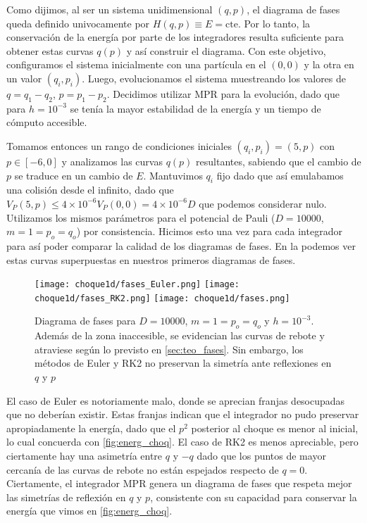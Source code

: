 Como dijimos, al ser un sistema unidimensional $(q,p)$, el diagrama de fases queda definido univocamente por $H(q,p)\equiv E = \text{cte}$.
Por lo tanto, la conservación de la energía por parte de los integradores resulta suficiente para obtener estas curvas $q(p)$ y así construir el diagrama.
Con este objetivo, configuramos el sistema inicialmente con una partícula en el $(0,0)$ y la otra en un valor $(q_i, p_i)$.
Luego, evolucionamos el sistema muestreando los valores de $q = q_1 - q_2$, $p = p_1 - p_2$.
Decidimos utilizar MPR para la evolución, dado que para $h=10^{-3}$ se tenía la mayor estabilidad de la energía y un tiempo de cómputo accesible.

Tomamos entonces un rango de condiciones iniciales $(q_i,p_i)=(5,p)$ con $p\in [-6,0]$ y analizamos las curvas $q(p)$ resultantes, sabiendo que el cambio de $p$ se traduce en un cambio de $E$. 
Mantuvimos $q_i$ fijo dado que así emulabamos una colisión desde el infinito, dado que $V_P(5,p)\leq 4\times10^{-6}V_P(0,0) = 4\times10^{-6}D$ que podemos considerar nulo.
Utilizamos los mismos parámetros para el potencial de Pauli ($D=10000$, $m=1=p_o=q_o$) por consistencia.
Hicimos esto una vez para cada integrador para así poder comparar la calidad de los diagramas de fases.
En la  podemos ver estas curvas superpuestas en nuestros primeros diagramas de fases.

\begin{figure}[H]
	\centering	%
	\texttt{[image: choque1d/fases\_Euler.png]}
	\texttt{[image: choque1d/fases\_RK2.png]}
	\texttt{[image: choque1d/fases.png]}
	\caption{Diagrama de fases para $D=10000$, $m=1=p_o=q_o$ y $h=10^{-3}$. Además de la zona inaccesible, se evidencian las curvas de rebote y atraviese según lo previsto en \ref{sec:teo_fases}.
	Sin embargo, los métodos de Euler y RK2 no preservan la simetría ante reflexiones en $q$ y $p$}
	\label{fig:ej_diag_fases}
\end{figure}

El caso de Euler es notoriamente malo, donde se aprecian franjas desocupadas que no deberían existir. 
Estas franjas indican que el integrador no pudo preservar apropiadamente la energía, dado que el $p^2$ posterior al choque es menor al inicial, lo cual concuerda con \ref{fig:energ_choq}.
El caso de RK2 es menos apreciable, pero ciertamente hay una asimetría entre $q$ y $-q$ dado que los puntos de mayor cercanía de las curvas de rebote no están espejados respecto de $q=0$.
Ciertamente, el integrador MPR genera un diagrama de fases que respeta mejor las simetrías de reflexión en $q$ y $p$, consistente con su capacidad para conservar la energía que vimos en \ref{fig:energ_choq}.

